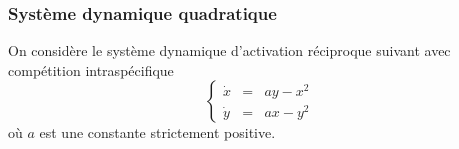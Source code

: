 \subsubsection{Système dynamique quadratique} \label{SystDyn-Quadratique}

On considère le système dynamique d’activation réciproque suivant avec compétition intraspécifique
$$
\left\{\begin{array}{rcl}
        \dot x & = & a y - x^2 \\ 
        \dot y & = & a x - y^2 
        \end{array}\right.
$$
où $a$ est une constante strictement positive.
